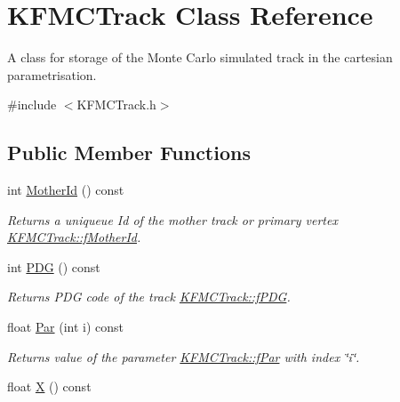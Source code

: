 \hypertarget{classKFMCTrack}{}\section{K\+F\+M\+C\+Track Class Reference}
\label{classKFMCTrack}


A class for storage of the Monte Carlo simulated track in the cartesian parametrisation.  




{\ttfamily \#include $<$K\+F\+M\+C\+Track.\+h$>$}

\subsection*{Public Member Functions}
\begin{DoxyCompactItemize}
\item 
int \hyperlink{classKFMCTrack_aee4ee150d6a40cd3b6980c0911b5baca}{Mother\+Id} () const \hypertarget{classKFMCTrack_aee4ee150d6a40cd3b6980c0911b5baca}{}\label{classKFMCTrack_aee4ee150d6a40cd3b6980c0911b5baca}

\begin{DoxyCompactList}\small\item\em Returns a uniqueue Id of the mother track or primary vertex \hyperlink{classKFMCTrack_a9e683b839f23428f807de774af689467}{K\+F\+M\+C\+Track\+::f\+Mother\+Id}. \end{DoxyCompactList}\item 
int \hyperlink{classKFMCTrack_a7886d5c74b5c4009d9ee4953708e3a93}{P\+DG} () const \hypertarget{classKFMCTrack_a7886d5c74b5c4009d9ee4953708e3a93}{}\label{classKFMCTrack_a7886d5c74b5c4009d9ee4953708e3a93}

\begin{DoxyCompactList}\small\item\em Returns P\+DG code of the track \hyperlink{classKFMCTrack_ac219c1249ea3583df69eaff39bb2058d}{K\+F\+M\+C\+Track\+::f\+P\+DG}. \end{DoxyCompactList}\item 
float \hyperlink{classKFMCTrack_a70a5cee126b92b46be6de1adbe960f6b}{Par} (int i) const \hypertarget{classKFMCTrack_a70a5cee126b92b46be6de1adbe960f6b}{}\label{classKFMCTrack_a70a5cee126b92b46be6de1adbe960f6b}

\begin{DoxyCompactList}\small\item\em Returns value of the parameter \hyperlink{classKFMCTrack_ab36c74aaad27e04eb0ae56afd538ba77}{K\+F\+M\+C\+Track\+::f\+Par} with index \char`\"{}i\char`\"{}. \end{DoxyCompactList}\item 
float \hyperlink{classKFMCTrack_ad510b77d425c6e1eeeacfdebe9f66f0d}{X} () const \hypertarget{classKFMCTrack_ad510b77d425c6e1eeeacfdebe9f66f0d}{}\label{classKFMCTrack_ad510b77d425c6e1eeeacfdebe9f66f0d}


\end{DoxyCompactItemize}
